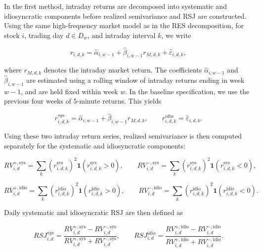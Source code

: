 \documentclass[11pt,a4paper]{article}
\begin{document}
In the first method, intraday returns are decomposed into systematic and
idiosyncratic components before realized semivariance and RSJ are
constructed. Using the same high-frequency market model as in the RES
decomposition, for stock \(i\), trading day \(d \in D_w\), and intraday
interval \(k\), we write

\begin{equation}
r_{i,d,k} = \hat{\alpha}_{i,w-1} + \hat{\beta}_{i,w-1} r_{M,d,k} + \hat{\varepsilon}_{i,d,k},
\label{eq:m1_model}
\end{equation}

where \(r_{M,d,k}\) denotes the intraday market return. The coefficients
\(\hat{\alpha}_{i,w-1}\) and \(\hat{\beta}_{i,w-1}\) are estimated using a
rolling window of intraday returns ending in week \(w-1\), and are held
fixed within week \(w\). In the baseline specification, we use the
previous four weeks of 5-minute returns. This yields

\begin{equation}
r^{sys}_{i,d,k} = \hat{\alpha}_{i,w-1} + \hat{\beta}_{i,w-1} r_{M,d,k},
\qquad
r^{idio}_{i,d,k} = \hat{\varepsilon}_{i,d,k}.
\label{eq:m1_decomp}
\end{equation}

Using these two intraday return series, realized semivariance is then
computed separately for the systematic and idiosyncratic components:

\begin{equation}
RV_{i,d}^{+,\mathrm{sys}} =
\sum_k \left(r_{i,d,k}^{\mathrm{sys}}\right)^2
\mathbf{1}(r_{i,d,k}^{\mathrm{sys}} > 0),
\qquad
RV_{i,d}^{-,\mathrm{sys}} =
\sum_k \left(r_{i,d,k}^{\mathrm{sys}}\right)^2
\mathbf{1}(r_{i,d,k}^{\mathrm{sys}} < 0),
\label{eq:semivar_sys}
\end{equation}

\begin{equation}
RV_{i,d}^{+,\mathrm{idio}} =
\sum_k \left(r_{i,d,k}^{\mathrm{idio}}\right)^2
\mathbf{1}(r_{i,d,k}^{\mathrm{idio}} > 0),
\qquad
RV_{i,d}^{-,\mathrm{idio}} =
\sum_k \left(r_{i,d,k}^{\mathrm{idio}}\right)^2
\mathbf{1}(r_{i,d,k}^{\mathrm{idio}} < 0).
\label{eq:semivar_idio}
\end{equation}

Daily systematic and idiosyncratic RSJ are then defined as

\begin{equation}
RSJ_{i,d}^{sys}
=
\frac{RV_{i,d}^{+,\mathrm{sys}} - RV_{i,d}^{-,\mathrm{sys}}}
{RV_{i,d}^{+,\mathrm{sys}} + RV_{i,d}^{-,\mathrm{sys}}},
\qquad
RSJ_{i,d}^{idio}
=
\frac{RV_{i,d}^{+,\mathrm{idio}} - RV_{i,d}^{-,\mathrm{idio}}}
{RV_{i,d}^{+,\mathrm{idio}} + RV_{i,d}^{-,\mathrm{idio}}}.
\label{eq:rsj_daily}
\end{equation}
\end{document}
